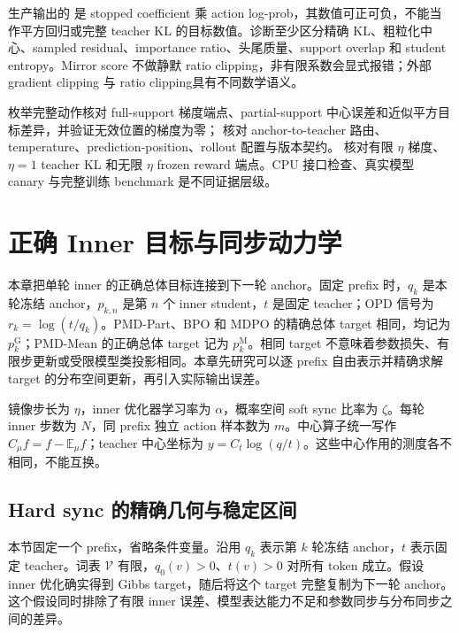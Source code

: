 \documentclass[lang=cn,scheme=chinese,openany]{../book/elegantbook}
\newcommand{\E}{\mathbb E}
\begin{document}
生产输出的  是 stopped coefficient 乘 action log-prob，其数值可正可负，不能当作平方回归或完整 teacher KL 的目标数值。诊断至少区分精确 KL、粗粒化中心、sampled residual、importance ratio、头尾质量、support overlap 和 student entropy。Mirror score 不做静默 ratio clipping，非有限系数会显式报错；外部 gradient clipping 与 ratio clipping具有不同数学语义。

 枚举完整动作核对 full-support 梯度端点、partial-support 中心误差和近似平方目标差异，并验证无效位置的梯度为零； 核对 anchor-to-teacher 路由、temperature、prediction-position、rollout 配置与版本契约。 核对有限 $\eta$ 梯度、$\eta=1$ teacher KL 和无限 $\eta$ frozen reward 端点。CPU 接口检查、真实模型 canary 与完整训练 benchmark 是不同证据层级。





\chapter{正确 Inner 目标与同步动力学}
\label{dyn:chapter}

本章把单轮 inner 的正确总体目标连接到下一轮 anchor。固定 prefix 时，$q_k$ 是本轮冻结 anchor，$p_{k,n}$ 是第 $n$ 个 inner student，$t$ 是固定 teacher；OPD 信号为 $r_k=\log(t/q_k)$。PMD-Part、BPO 和 MDPO 的精确总体 target 相同，均记为 $p_k^{\mathrm G}$；PMD-Mean 的正确总体 target 记为 $p_k^{\mathrm M}$。相同 target 不意味着参数损失、有限步更新或受限模型类投影相同。本章先研究可以逐 prefix 自由表示并精确求解 target 的分布空间更新，再引入实际输出误差。

镜像步长为 $\eta$，inner 优化器学习率为 $\alpha$，概率空间 soft sync 比率为 $\zeta$。每轮 inner 步数为 $N$，同 prefix 独立 action 样本数为 $m$。中心算子统一写作 $C_\mu f=f-\E_\mu f$；teacher 中心坐标为 $y=C_t\log(q/t)$。这些中心作用的测度各不相同，不能互换。


\section{Hard sync 的精确几何与稳定区间}
\label{dyn:sec:hard-sync-geometry}

本节固定一个 prefix，省略条件变量。沿用 $q_k$ 表示第 $k$ 轮冻结 anchor，$t$ 表示固定 teacher。词表 $\mathcal V$ 有限，$q_0(v)>0$、$t(v)>0$ 对所有 token 成立。假设 inner 优化确实得到 Gibbs target，随后将这个 target 完整复制为下一轮 anchor。这个假设同时排除了有限 inner 误差、模型表达能力不足和参数同步与分布同步之间的差异。
\end{document}
